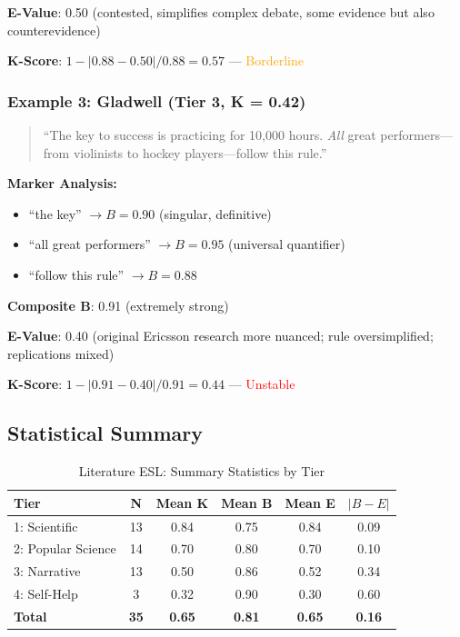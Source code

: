 \documentclass[11pt,a4paper]{article}
\begin{document}
\textbf{E-Value}: 0.50 (contested, simplifies complex debate, some evidence but also counterevidence)

\textbf{K-Score}: $1 - |0.88 - 0.50| / 0.88 = 0.57$ --- \textcolor{orange}{Borderline}

\subsubsection{Example 3: Gladwell (Tier 3, K = 0.42)}

\begin{quote}
``The key to success is practicing for 10,000 hours. \textit{All} great performers---from violinists to hockey players---follow this rule.''
\end{quote}

\textbf{Marker Analysis:}
\begin{itemize}
    \item ``the key'' $\to B = 0.90$ (singular, definitive)
    \item ``all great performers'' $\to B = 0.95$ (universal quantifier)
    \item ``follow this rule'' $\to B = 0.88$
\end{itemize}

\textbf{Composite B}: 0.91 (extremely strong)

\textbf{E-Value}: 0.40 (original Ericsson research more nuanced; rule oversimplified; replications mixed)

\textbf{K-Score}: $1 - |0.91 - 0.40| / 0.91 = 0.44$ --- \textcolor{red}{Unstable}

\subsection{Statistical Summary}

\begin{table}[h]
\centering
\caption{Literature ESL: Summary Statistics by Tier}
\begin{tabular}{lccccc}
\toprule
\textbf{Tier} & \textbf{N} & \textbf{Mean K} & \textbf{Mean B} & \textbf{Mean E} & \textbf{$|B-E|$} \\
\midrule
1: Scientific & 13 & 0.84 & 0.75 & 0.84 & 0.09 \\
2: Popular Science & 14 & 0.70 & 0.80 & 0.70 & 0.10 \\
3: Narrative & 13 & 0.50 & 0.86 & 0.52 & 0.34 \\
4: Self-Help & 3 & 0.32 & 0.90 & 0.30 & 0.60 \\
\midrule
\textbf{Total} & \textbf{35} & \textbf{0.65} & \textbf{0.81} & \textbf{0.65} & \textbf{0.16} \\
\bottomrule
\end{tabular}
\end{table}
\end{document}
